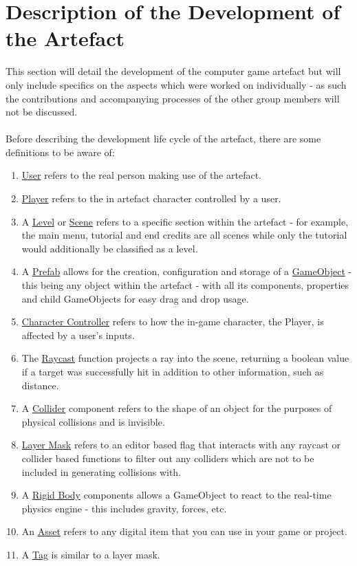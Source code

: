 \section{Description of the Development of the Artefact}
This section will detail the development of the computer game artefact but will only include specifics on the aspects which were worked on individually - as such the contributions and accompanying processes of the other group members will not be discussed. 
\\\\
Before describing the development life cycle of the artefact, there are some definitions to be aware of:
\begin{enumerate}
\item \underline{User} refers to the real person making use of the artefact.
\item \underline{Player} refers to the in artefact character controlled by a user.
\item A \underline{Level} or \underline{Scene} refers to a specific section within the artefact - for example, the main menu, tutorial and end credits are all scenes while only the tutorial would additionally be classified as a level.
\item A \underline{Prefab} allows for the creation, configuration and storage of a \underline{GameObject} - this being any object within the artefact - with all its components, properties and child GameObjects for easy drag and drop usage.
\item \underline{Character Controller} refers to how the in-game character, the Player, is affected by a user's inputs.
\item The \underline{Raycast} function projects a ray into the scene, returning a boolean value if a target was successfully hit in addition to other information, such as distance.
\item A \underline{Collider} component refers to the shape of an object for the purposes of physical collisions and is invisible.
\item \underline{Layer Mask} refers to an editor based flag that interacts with any raycast or collider based functions to filter out any colliders which are not to be included in generating collisions with.
\item A \underline{Rigid Body} components allows a GameObject to react to the real-time physics engine - this includes gravity, forces, etc.
\item An \underline{Asset} refers to any digital item that you can use in your game or project.
\item A \underline{Tag} is similar to a layer mask.
\end{enumerate}



